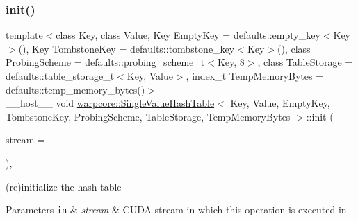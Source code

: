 \subsubsection{\texorpdfstring{init()}{init()}\hspace{0.1cm}{\footnotesize\ttfamily [2/2]}}
{\footnotesize\ttfamily template$<$class Key, class Value, Key Empty\+Key = defaults\+::empty\+\_\+key$<$\+Key$>$(), Key Tombstone\+Key = defaults\+::tombstone\+\_\+key$<$\+Key$>$(), class Probing\+Scheme = defaults\+::probing\+\_\+scheme\+\_\+t$<$\+Key, 8$>$, class Table\+Storage = defaults\+::table\+\_\+storage\+\_\+t$<$\+Key, Value$>$, index\+\_\+t Temp\+Memory\+Bytes = defaults\+::temp\+\_\+memory\+\_\+bytes()$>$ \\
\+\_\+\+\_\+host\+\_\+\+\_\+ void \hyperlink{classwarpcore_1_1SingleValueHashTable}{warpcore\+::\+Single\+Value\+Hash\+Table}$<$ Key, Value, Empty\+Key, Tombstone\+Key, Probing\+Scheme, Table\+Storage, Temp\+Memory\+Bytes $>$\+::init (\begin{DoxyParamCaption}\item[{const cuda\+Stream\+\_\+t}]{stream = {} }\end{DoxyParamCaption})\hspace{0.3cm}{\ttfamily [inline]}, {\ttfamily [noexcept]}}



(re)initialize the hash table 


\begin{DoxyParams}[1]{Parameters}
\mbox{\tt in}  & {\em stream} & C\+U\+DA stream in which this operation is executed in \\
\hline
\end{DoxyParams}
\mbox{\label{classwarpcore_1_1SingleValueHashTable_abd60992f9e6418a2ca792a6058aa2dab}} 
